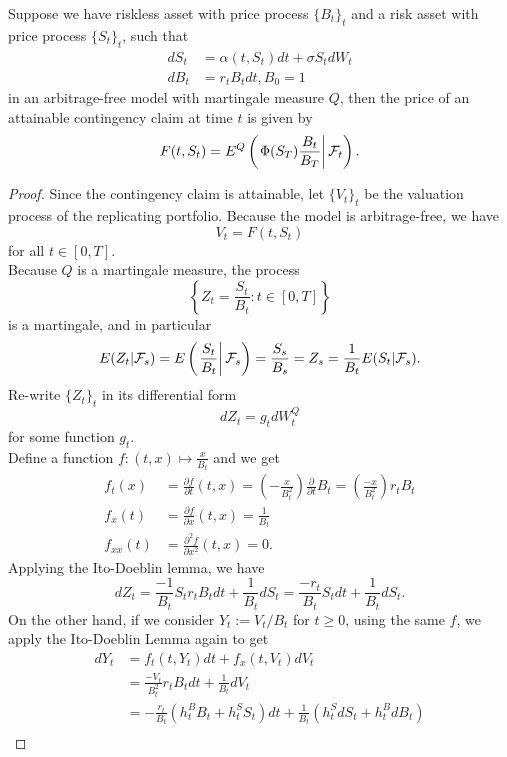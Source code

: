 \documentclass[11pt,fleqn]{book} %
\begin{document}
\begin{theorem} \label{thm:428}
Suppose we have riskless asset with price process \(\{B_t\}_t\) and a risk asset with price process \(\{S_t\}_t\), such that
\[
\begin{aligned}
dS_t &= \alpha(t, S_t)dt + \sigma S_tdW_t \\
dB_t &= r_tB_tdt, B_0 = 1
\end{aligned}
\]
in an arbitrage-free model with martingale measure \(Q\), then the price of an attainable contingency claim at time \(t\) is given by
\[
F(t, S_t) = E^Q\left(\left.\Phi(S_T)\frac{B_t}{B_T}\right|\mathcal{F}_t\right).
\]
\end{theorem}
\begin{proof}
Since the contingency claim is attainable, let \(\{V_t\}_t\) be the valuation process of the replicating portfolio. Because the model is arbitrage-free, we have
\[
V_t = F(t, S_t)
\]
for all \(t \in [0, T]\). \\
\indent Because \(Q\) is a martingale measure, the process
\[
\left\{Z_t = \frac{S_t}{B_t}: t \in [0, T]\right\}
\]
is a martingale, and in particular
\[
E(Z_t | \mathcal{F}_s) = E\left(\left.\frac{S_t}{B_t}\right|\mathcal{F}_s\right) = \frac{S_s}{B_s} = Z_s = \frac{1}{B_t}E(S_t|\mathcal{F}_s).
\]
\indent Re-write \(\{Z_t\}_t\) in its differential form
\[
dZ_t = g_tdW_t^Q
\]
for some function \(g_t\). \\
\indent Define a function \(f: (t, x) \mapsto \frac{x}{B_t}\) and we get
\[
\begin{aligned}
f_t(x) &= \frac{\partial f}{\partial t}(t, x) = \left(-\frac{x}{B_t^2}\right)\frac{\partial}{\partial t}B_t = \left(\frac{-x}{B_t^2}\right)r_tB_t \\
f_x(t) &= \frac{\partial f}{\partial x}(t, x) = \frac{1}{B_t} \\
f_{xx}(t) &= \frac{\partial^2 f}{\partial x^2}(t, x) = 0.
\end{aligned}
\]
\indent Applying the Ito-Doeblin lemma, we have
\[
dZ_t = \frac{-1}{B_t}S_tr_tB_tdt + \frac{1}{B_t}dS_t = \frac{-r_t}{B_t}S_tdt + \frac{1}{B_t}dS_t.
\]
\indent On the other hand, if we consider \(Y_t := V_t / B_t\) for \(t\geq0\), using the same \(f\), we apply the Ito-Doeblin Lemma again to get
\[
\begin{aligned}
dY_t &= f_t(t, Y_t)dt + f_x(t, V_t)dV_t \\
&= \frac{-V_t}{B_t^2}r_tB_tdt + \frac{1}{B_t}dV_t \\
&= -\frac{r_t}{B_t}(h_t^BB_t + h_t^SS_t)dt + \frac{1}{B_t}(h_t^SdS_t + h_t^BdB_t) \\

\end{aligned}\]
\end{proof}
\end{document}
